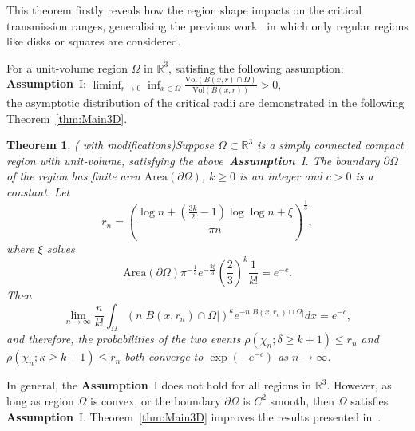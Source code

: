 \documentclass[preprint,12pt]{elsarticle}
\newtheorem{theorem}{Theorem}
\begin{document}
This theorem  firstly reveals how the region shape impacts on the critical transmission ranges,
  generalising the previous work~\cite{DH-largest-NN, Penrose-RGG-book,Penrose-k-connectivity,PWan04:Asymptotic-critical-transmission-MobileHoc, PJWan-IT-asymptotic-radius} in which only regular regions like disks or squares are considered.

  For a unit-volume region $\Omega$ in $\mathbb{R}^3$,  satisfing the following assumption:\\
\textbf{Assumption}~I: $\liminf_{r\rightarrow 0} \inf_{x\in\Omega}\frac{\mathrm{Vol}(B(x,r)\cap \Omega )}{\mathrm{Vol}(B(x,r))}>0,$ \\
the asymptotic distribution of the critical radii are demonstrated in the following Theorem~\ref{thm:Main3D}.

\begin{theorem}(\cite{Ding2022-3DRadii} with modifications)\label{thm:old-3}
Suppose $\Omega\subset \mathbb{R}^3$ is a simply connected compact region with unit-volume,
satisfying the above~\textbf{Assumption}~I.
The boundary $\partial\Omega$ of the region has finite area $\mathrm{Area}(\partial\Omega)$, $k\geq 0$ is an integer and $c>0$ is a constant.
Let
 \begin{equation}\label{eq:Theorem-radius}
 r_n= \left(\frac{\log n+(\frac{3k}{2}-1)\log\log n+\xi}{  \pi n  }\right)^{\frac13},
\end{equation}
where   $\xi$  solves
\begin{equation}\label{eq:Theorem-radius-1}
\mathrm{Area}(\partial\Omega)\pi^{-\frac{1}{3}} e^{-\frac{2\xi}{3}}\left(\frac{2}{3}\right)^k\frac{1}{k!} =e^{-c}.
\end{equation}
Then
    \begin{equation}\label{eq:Theorem-formula-3}
       \lim_{n\rightarrow\infty} \frac n{k!}\int_{\Omega}\left(n|B(x,r_n)\cap\Omega|\right)^k e^{-n|B(x,r_n)\cap\Omega|}dx= e^{-c},
    \end{equation}
and therefore, the probabilities of the two events
$\rho(\chi_n;\delta\geq k+1)\leq r_n$ and $\rho(\chi_n;\kappa\geq
k+1)\leq r_n$ both converge to $\exp\left(-e^{-c}\right)$  as $n\rightarrow\infty$.
\end{theorem}

In general, the \textbf{Assumption}~I does not hold for all regions in $\mathbb{R}^3$. However,
 as long as region $\Omega$ is convex, or the boundary $\partial\Omega$ is $C^2$ smooth, then $\Omega$ satisfies \textbf{Assumption}~I.
Theorem~\ref{thm:Main3D}  improves the results presented in~\cite{Ding2022-3DRadii}.
\end{document}
